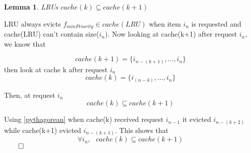 \newtheorem{theorem}{Theorem}[section]
\newtheorem{corollary}{Corollary}[theorem]
\newtheorem{lemma}[theorem]{Lemma}
\newtheorem{definition}{Definition}[section]
\begin{lemma}
    LRUs $cache(k) \subseteq cache(k+1)$
\end{lemma}
LRU always evicts $f_{minPriority} \in cache(LRU)$ when item $i_n$ is requested and cache(LRU) can't contain size($i_n$). Now looking at cache(k+1) after request $i_n$, we know that 

\[cache(k+1) = \{i_{n-(k+1)},..., i_n \} \]
then look at cache k after request $i_n$
\[cache(k) = \{i_{(n-k)},..., i_{n} \} \]

Then, at request $i_n$
\[cache(k) \subseteq cache(k+1)\]

Using \ref{pythagorean} when cache(k) received request $i_{n-1}$ it evicted $i_{n-(k+2)}$ while cache(k+1) evicted $i_{n-(k+1)}$. This shows that  
\[\forall i_n, \textbf{ } cache(k) \subseteq cache(k+1) \]
$\qed$